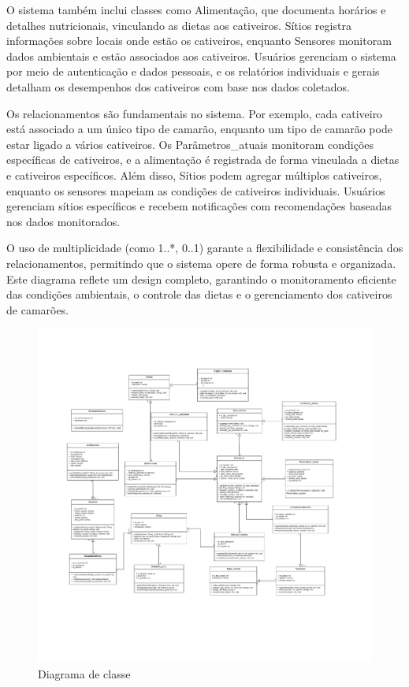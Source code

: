 \documentclass[
  a4paper,
  12pt,
  english,
  brazilian,
]{article}
\begin{document}
O sistema também inclui classes como Alimentação, que documenta horários e detalhes nutricionais, vinculando as dietas aos cativeiros. Sítios registra informações sobre locais onde estão os cativeiros, enquanto Sensores monitoram dados ambientais e estão associados aos cativeiros. Usuários gerenciam o sistema por meio de autenticação e dados pessoais, e os relatórios individuais e gerais detalham os desempenhos dos cativeiros com base nos dados coletados.

Os relacionamentos são fundamentais no sistema. Por exemplo, cada cativeiro está associado a um único tipo de camarão, enquanto um tipo de camarão pode estar ligado a vários cativeiros. Os Parâmetros\_atuais monitoram condições específicas de cativeiros, e a alimentação é registrada de forma vinculada a dietas e cativeiros específicos. Além disso, Sítios podem agregar múltiplos cativeiros, enquanto os sensores mapeiam as condições de cativeiros individuais. Usuários gerenciam sítios específicos e recebem notificações com recomendações baseadas nos dados monitorados.

O uso de multiplicidade (como 1..*, 0..1) garante a flexibilidade e consistência dos relacionamentos, permitindo que o sistema opere de forma robusta e organizada. Este diagrama reflete um design completo, garantindo o monitoramento eficiente das condições ambientais, o controle das dietas e o gerenciamento dos cativeiros de camarões.

    \begin{figure}[!h]
        \centering
        \caption{Diagrama de classe}%
        \label{fig:diagrama-classe}
         \includegraphics[width=1\textwidth]{Imagem/Diagramas de Classe.jpg}
        \end{figure}
\end{document}
